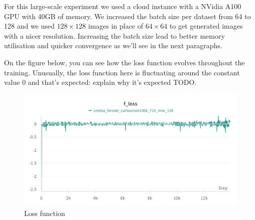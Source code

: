 \documentclass[11pt]{article}
\begin{document}
For this large-scale experiment we used a cloud instance with a NVidia A100 GPU with 40GB of memory. We increased the batch size per dataset from 64 to 128 and we used $128\times128$ images in place of $64\times64$ to get generated images with a nicer resolution. Increasing the batch size lead to better memory utilisation and quicker convergence as we'll see in the next paragraphs.

On the figure below, you can see how the loss function evolves throughout the training. Unusually, the loss function here is fluctuating around the constant value 0 and that's expected: explain why it's expected TODO.

\begin{figure}[h!]
    \centering
    \includegraphics[scale=.05]{figures/loss_real_dataset.png}
    \caption{Loss function}
\end{figure}
\end{document}
